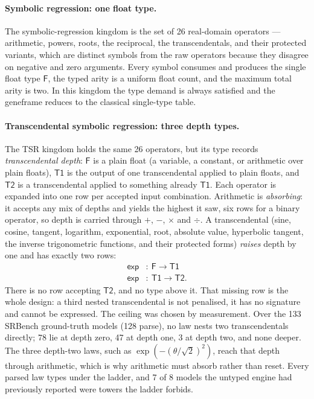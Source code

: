 \documentclass[sigconf,nonacm]{acmart}
\newcommand{\ty}[1]{\textsf{#1}}
\begin{document}
\paragraph{Symbolic regression: one float type.} The symbolic-regression
kingdom is the set of 26 real-domain operators --- arithmetic, powers, roots, the
reciprocal, the transcendentals, and their protected variants, which are
distinct symbols from the raw operators because they disagree on negative and
zero arguments. Every symbol consumes and produces the single float type
$\ty{F}$, the typed arity is a uniform float count, and the maximum total arity
is two. In this kingdom the type demand is always satisfied and the geneframe
reduces to the classical single-type table.

\paragraph{Transcendental symbolic regression: three depth types.} The TSR
kingdom holds the same 26 operators, but its type records \emph{transcendental
depth}: $\ty{F}$ is a plain float (a variable, a constant, or arithmetic over
plain floats), $\ty{T1}$ is the output of one transcendental applied to plain
floats, and $\ty{T2}$ is a transcendental applied to something already
$\ty{T1}$. Each operator is expanded into one row per accepted input
combination. Arithmetic is \emph{absorbing}: it accepts any mix of depths and
yields the highest it saw, six rows for a binary operator, so depth is carried
through $+$, $-$, $\times$ and $\div$. A transcendental (sine, cosine, tangent,
logarithm, exponential, root, absolute value, hyperbolic tangent, the inverse
trigonometric functions, and their protected forms) \emph{raises} depth by one
and has exactly two rows:
\begin{align*}
\ty{exp}&:\ \ty{F}\to\ty{T1}\\
\ty{exp}&:\ \ty{T1}\to\ty{T2}.
\end{align*}
There is no row accepting $\ty{T2}$, and no type above it. That missing row is
the whole design: a third nested transcendental is not penalised, it has no
signature and cannot be expressed. The ceiling was chosen by measurement. Over the 133 SRBench ground-truth models (128 parse), no law nests two
transcendentals directly; 78 lie at depth zero, 47 at depth one, 3 at depth two,
and none deeper. The three depth-two laws, such as
$\exp(-(\theta/\sqrt{2})^{2})$, reach that depth through arithmetic, which is
why arithmetic must absorb rather than reset. Every parsed law types under the
ladder, and 7 of 8 models the untyped engine had previously reported were
towers the ladder forbids.
\end{document}
